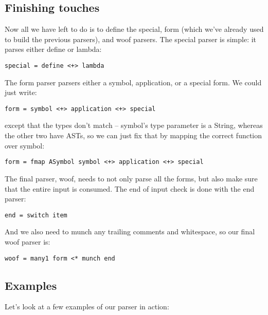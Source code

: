 \documentclass{tmr}
\begin{document}
\subsection{Finishing touches}
Now all we have left to do is to define the special, form (which we've already used to build
the previous parsers), and woof parsers.  The special parser is simple:  it parses either 
define or lambda:
\begin{verbatim}
special = define <+> lambda
\end{verbatim}
The form parser parsers either a symbol, application, or a special form.  We could just write:
\begin{verbatim}
form = symbol <+> application <+> special
\end{verbatim}
except that the types don't match -- symbol's type parameter is a String, whereas the other two
have ASTs, so we can just fix that by mapping the correct function over symbol:
\begin{verbatim}
form = fmap ASymbol symbol <+> application <+> special
\end{verbatim}
The final parser, woof, needs to not only parse all the forms, but also make sure that the
entire input is consumed.  The end of input check is done with the end parser:
\begin{verbatim}
end = switch item
\end{verbatim}
And we also need to munch any trailing comments and whitespace, so our final woof parser is:
\begin{verbatim}
woof = many1 form <* munch end
\end{verbatim}

\subsection{Examples}
Let's look at a few examples of our parser in action:
\end{document}
